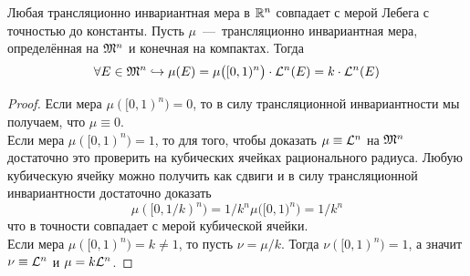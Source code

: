 \begin{theorem} Любая трансляционно инвариантная мера в $\mathbb{R}^n$ совпадает с мерой Лебега с точностью до константы. Пусть $\mu$~---~трансляционно инвариантная мера, определённая на $\mathfrak{M}^n$ и конечная на компактах. Тогда \[\forall E \in \mathfrak{M}^n \hookrightarrow \mu(E) = \mu \big([0, 1)^n \big)\cdot\mathcal{L}^n(E) =  k \cdot \mathcal{L}^n(E) \]
\end{theorem}
\begin{proof}
    Если мера $\mu([0, 1)^n) = 0$, то в силу трансляционной инвариантности мы получаем, что $\mu \equiv 0$. \\
    Если мера $\mu([0, 1)^n) = 1$, то для того, чтобы доказать $\mu \equiv \mathcal{L}^n$ на $\mathfrak{M}^n$ достаточно это проверить на кубических ячейках рационального радиуса. Любую кубическую ячейку можно получить как сдвиги и в силу трансляционной инвариантности достаточно доказать 
$$\mu([0, 1/k)^n) = 1/k^n\mu \big([0, 1)^n \big) = 1/k^n$$что в точности совпадает с мерой кубической ячейки. \\
    Если мера $\mu([0, 1)^n) = k \neq 1$, то пусть $\nu = \mu/k$. Тогда $\nu([0, 1)^n) = 1$, а значит $\nu \equiv \mathcal{L}^n$ и $\mu = k\mathcal{L}^n$.
\end{proof}